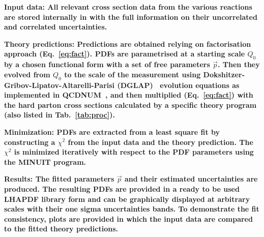 \begin{description}
\item 
\bf {Input data:} \rm  All relevant cross section data from the various reactions
are stored internally in \fitter with the full information on their uncorrelated and correlated
uncertainties.
\item
\bf{Theory predictions:} \rm Predictions are obtained relying on factorisation approach (Eq.~\ref{eq:fact}). PDFs are parametrised at a starting scale $Q_0$  by a chosen functional form with a set of free parameters $\vec{p}$. Then they evolved from $Q_0$ to the scale of the measurement using 
Dokshitzer-Gribov-Lipatov-Altarelli-Parisi 
(DGLAP)~\cite{Gribov:1972ri, Gribov:1972rt, Lipatov:1974qm,
Dokshitzer:1977sg, Altarelli:1977zs} evolution equations 
as implemented in QCDNUM~\cite{qcdnum}, 
and then multiplied (Eq.~\ref{eq:fact}) with the hard parton cross sections calculated by
a specific theory program (also listed in Tab.~\ref{tab:proc}).
\item
\bf{Minimization:} \rm  PDFs are extracted from a least square fit by constructing a 
$\chi^2$ from the input data and the theory prediction.
The $\chi^2$ is  minimized iteratively 
with respect to the PDF parameters using the MINUIT\cite{Minuit} program.
%
%
\item
\bf{Results:} \rm  The fitted parameters $\vec{p}$ and their estimated uncertainties are produced.
The resulting PDFs are provided in a ready to be used LHAPDF library form
and can be graphically 
displayed at arbitrary scales with their one sigma uncertainties bands.
To demonstrate the fit consistency, plots are provided 
in which the input data are compared to the fitted theory predictions.
\end{description}
%


